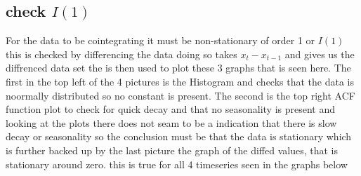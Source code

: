 \subsection{check $I(1)$}
For the data to be cointegrating it  must be non-stationary of order 1 or $I(1)$ this is checked by differencing the data doing so takes $x_t-x_{t-1}$ and gives us the diffrenced data set the is then used to plot these 3 graphs that is seen here. The first in the top left of the 4 pictures is the Histogram and checks that the data is noormally distributed so no constant is present. The second is the top right ACF function plot to check for quick decay and that no seasonality is present and looking at the plots there does not seam to be a indication that there is slow decay or seasonality so the conclusion must be that the data is stationary which is further backed up by the last picture the graph of the diffed values, that is stationary around zero. this is true for all 4 timeseries seen in the graphs below
